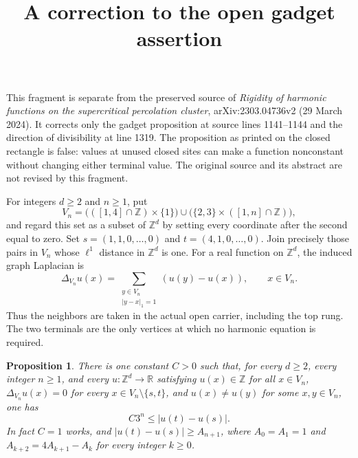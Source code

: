 \documentclass[11pt]{article}
\newtheorem{proposition}{Proposition}
\begin{document}
\title{A correction to the open gadget assertion}
\author{}
\date{}
\maketitle
This fragment is separate from the preserved source of
\emph{Rigidity of harmonic functions on the supercritical percolation cluster},
arXiv:2303.04736v2 (29 March 2024). It corrects only the gadget proposition
at source lines 1141--1144 and the direction of divisibility at line 1319.
The proposition as printed on the closed rectangle is false: values at unused
closed sites can make a function nonconstant without changing either terminal value.
The original source and its abstract are not revised by this fragment.

For integers $d\geq2$ and $n\geq1$, put
\[
V_n=\bigl(([1,4]\cap\mathbb Z)\times\{1\}\bigr)
 \cup\bigl(\{2,3\}\times([1,n]\cap\mathbb Z)\bigr),
\]
and regard this set as a subset of $\mathbb Z^d$ by setting every coordinate
after the second equal to zero. Set $s=(1,1,0,\ldots,0)$ and
$t=(4,1,0,\ldots,0)$. Join precisely those pairs in $V_n$ whose
$\ell^1$ distance in $\mathbb Z^d$ is one. For a real function on
$\mathbb Z^d$, the induced graph Laplacian is
\[
\Delta_{V_n}u(x)=\sum_{\substack{y\in V_n\\|y-x|_1=1}}(u(y)-u(x)),
\qquad x\in V_n.
\]
Thus the neighbors are taken in the actual open carrier, including the top rung.
The two terminals are the only vertices at which no harmonic equation is required.

\begin{proposition}
There is one constant $C>0$ such that, for every $d\geq2$, every integer
$n\geq1$, and every $u : \mathbb Z^d\to\mathbb R$ satisfying
$u(x)\in\mathbb Z$ for all $x\in V_n$,
$\Delta_{V_n}u(x)=0$ for every $x\in V_n\setminus\{s,t\}$,
and $u(x)\ne u(y)$ for some $x,y\in V_n$, one has
\[
 C3^n\leq |u(t)-u(s)|.
\]
In fact $C=1$ works, and $|u(t)-u(s)|\geq A_{n+1}$, where
$A_0=A_1=1$ and $A_{k+2}=4A_{k+1}-A_k$ for every integer $k\geq0$.
\end{proposition}
\end{document}
